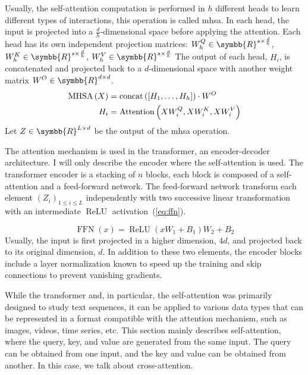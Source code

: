 \documentclass[../main.tex]{subfiles}
\begin{document}
	 Usually, the self-attention computation is performed in \(h\) different heads to learn different types of interactions, this operation is called \gls{mhsa}.
	 In each head, the input is projected into a \(\frac{d}{h}\)-dimensional space before applying the attention.
	 Each head has its own independent projection matrices: \(W^Q_h \in \symbb{R}^{s \times \frac{d}{h}}\), \(W^K_h \in \symbb{R}^{s \times \frac{d}{h}}\), \(W^V_h \in \symbb{R}^{s \times \frac{d}{h}}\)
	 The output of each head, \(H_i\), is concatenated and projected back to a \(d\)-dimensional space with another weight matrix \(W^O \in \symbb{R}^{d \times d}\).
	 \begin{align}
		 \operatorname{MHSA}\left(X\right) & = \operatorname{concat}\left(\left[H_1, \ldots, H_h \right] \right)\cdot W^O \\
		 H_i                 & = \operatorname{Attention}\left(XW^Q_i, XW^K_i, XW^V_i\right)
	 \end{align}
	 Let \(Z \in \symbb{R}^{L \times d}\) be the output of the \gls{mhsa} operation.

	 The attention mechanism is used in the transformer, an encoder-decoder architecture.
	 I will only describe the encoder where the self-attention is used.
	 The transformer encoder is a stacking of \(n\) blocks, each block is composed of a self-attention and a feed-forward network.
	 The feed-forward network transform each element \({\left(Z_i\right)}_{1 \leq i \leq L}\) independently with two successive linear transformation with an intermediate \(\operatorname{ReLU}\) activation~(\cref{eq:ffn}).

	 \begin{equation}
		 \operatorname{FFN}\left(x\right) = \operatorname{ReLU}\left(xW_1 + B_1\right)W_2 + B_2 \label{eq:ffn}
	 \end{equation}
	 Usually, the input is first projected in a higher dimension, \(4d\), and projected back to its original dimension, \(d\).
	 In addition to these two elements, the encoder blocks include a layer normalization known to speed up the training and skip connections to prevent vanishing gradients.

	 While the transformer and, in particular, the self-attention was primarily designed to study text sequences, it can be applied to various data types that can be represented in a format compatible with the attention mechanism, such as images, videos, time series, etc.
	 This section mainly describes self-attention, where the query, key, and value are generated from the same input.
	 The query can be obtained from one input, and the key and value can be obtained from another.
	 In this case, we talk about cross-attention.
\end{document}
